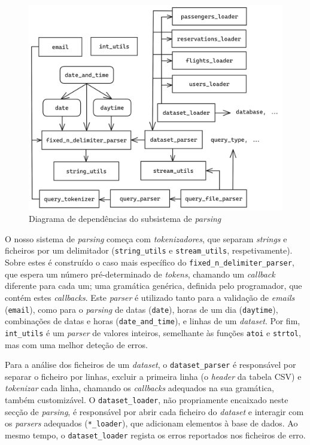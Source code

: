 \documentclass[12pt, a4paper]{article}
\begin{document}
\begin{figure}[ht]
    \centering
    \includegraphics[scale=0.17]{res/parsing.png}
    \caption{Diagrama de dependências do subsistema de \emph{parsing}}
    \label{fig:parsing}
\end{figure}

O nosso sistema de \emph{parsing} começa com \emph{tokenizadores}, que separam \emph{strings} e
ficheiros por um delimitador (\texttt{string\_utils} e \texttt{stream\_utils}, respetivamente).
Sobre estes é construído o caso mais específico do \texttt{fixed\_n\_delimiter\_parser}, que espera
um número pré-determinado de \emph{tokens}, chamando um \emph{callback} diferente para cada um; uma
gramática genérica, definida pelo programador, que contém estes \emph{callbacks}. Este \emph{parser}
é utilizado tanto para a validação de \emph{emails} (\texttt{email}), como para o \emph{parsing} de
datas (\texttt{date}), horas de um dia (\texttt{daytime}), combinações de datas e horas
(\texttt{date\_and\_time}), e linhas de um \emph{dataset}. Por fim, \texttt{int\_utils} é um
\emph{parser} de valores inteiros, semelhante às funções \texttt{atoi} e \texttt{strtol}, mas com
uma melhor deteção de erros.

Para a análise dos ficheiros de um \emph{dataset}, o \texttt{dataset\_parser} é responsável por
separar o ficheiro por linhas, excluir a primeira linha (o \emph{header} da tabela CSV) e
\emph{tokenizar} cada linha, chamando os \emph{callbacks} adequados na sua gramática, também
customizável. O \texttt{dataset\_loader}, não propriamente encaixado neste secção de
\emph{parsing}, é responsável por abrir cada ficheiro do \emph{dataset} e interagir com os
\emph{parsers} adequados (\texttt{*\_loader}), que adicionam elementos à base de dados. Ao mesmo
tempo, o \texttt{dataset\_loader} regista os erros reportados nos ficheiros de erro.
\end{document}
